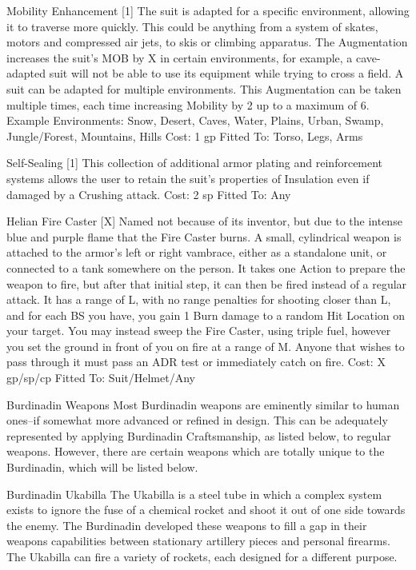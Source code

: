 \documentclass[oneside,11pt,english]{book}
\begin{document}
 

Mobility Enhancement [1] 
The suit is adapted for a specific environment, allowing it to traverse more quickly. This could be 
anything from a system of skates, motors and compressed air jets, to skis or climbing apparatus. The 
Augmentation increases the suit’s MOB by X in certain environments, for example, a cave-adapted suit 
will not be able to use its equipment while trying to cross a field. A suit can be adapted for multiple 
environments. This Augmentation can be taken multiple times, each time increasing Mobility by 2 up to a 
maximum of 6. 
Example Environments: Snow, Desert, Caves, Water, Plains, Urban, Swamp, Jungle/Forest, Mountains, 
Hills 
Cost: 1 gp 
Fitted To: Torso, Legs, Arms 

 

Self-Sealing [1] 
This collection of additional armor plating and reinforcement systems allows the user to retain the suit’s 
properties of Insulation even if damaged by a Crushing attack. 
Cost: 2 sp 
Fitted To: Any 

 


Helian Fire Caster [X] 
Named not because of its inventor, but due to the intense blue and purple flame that the Fire Caster burns. 
A small, cylindrical weapon is attached to the armor’s left or right vambrace, either as a standalone unit, 
or connected to a tank somewhere on the person. It takes one Action to prepare the weapon to fire, but 
after that initial step, it can then be fired instead of a regular attack. It has a range of L, with no range 
penalties for shooting closer than L, and for each BS you have, you gain 1 Burn damage to a random Hit 
Location on your target. You may instead sweep the Fire Caster, using triple fuel, however you set the 
ground in front of you on fire at a range of M. Anyone that wishes to pass through it must pass an ADR 
test or immediately catch on fire. 
Cost: X gp/sp/cp 
Fitted To: Suit/Helmet/Any 

 

Burdinadin Weapons 
Most Burdinadin weapons are eminently similar to human ones--if somewhat more advanced or refined in 
design. This can be adequately represented by applying Burdinadin Craftsmanship, as listed below, to 
regular weapons. However, there are certain weapons which are totally unique to the Burdinadin, which 
will be listed below. 

 

Burdinadin Ukabilla 
The Ukabilla is a steel tube in which a complex system exists to ignore the fuse of a chemical rocket and 
shoot it out of one side towards the enemy. The Burdinadin developed these weapons to fill a gap in their 
weapons capabilities between stationary artillery pieces and personal firearms. The Ukabilla can fire a 
variety of rockets, each designed for a different purpose. 
\end{document}
